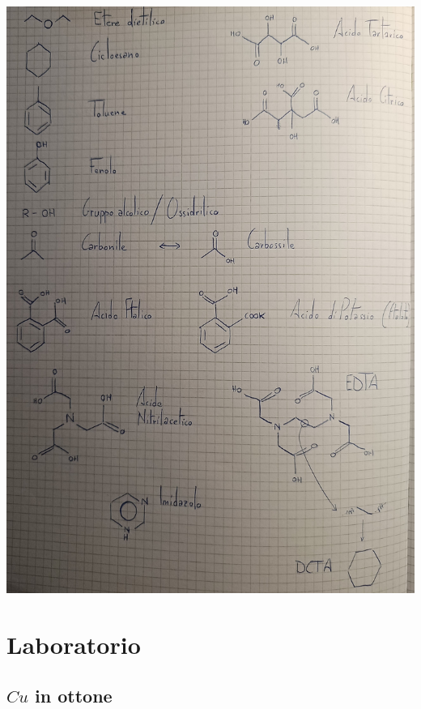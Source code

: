 \documentclass{article}
\begin{document}
\begin{center}
	\includegraphics*[width=0.9\linewidth]{../images/doodles.jpg}
\end{center}

\section{Laboratorio}

\subsection{$Cu$ in ottone}
\end{document}
